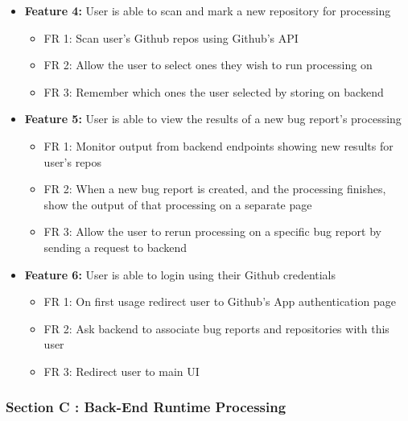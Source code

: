 \documentclass[12pt]{article}
\providecommand{\tightlist}{%
  \setlength{\itemsep}{0pt}\setlength{\parskip}{0pt}}
\begin{document}
\begin{itemize}
\tightlist
\item
  \textbf{Feature 4:} User is able to scan and mark a new repository for
  processing

  \begin{itemize}
  \tightlist
  \item
    FR 1: Scan user's Github repos using Github's API
  \item
    FR 2: Allow the user to select ones they wish to run processing on
  \item
    FR 3: Remember which ones the user selected by storing on backend
  \end{itemize}
\item
  \textbf{Feature 5:} User is able to view the results of a new bug
  report's processing

  \begin{itemize}
  \tightlist
  \item
    FR 1: Monitor output from backend endpoints showing new results for
    user's repos
  \item
    FR 2: When a new bug report is created, and the processing finishes,
    show the output of that processing on a separate page
  \item
    FR 3: Allow the user to rerun processing on a specific bug report by
    sending a request to backend
  \end{itemize}
\item
  \textbf{Feature 6:} User is able to login using their Github
  credentials

  \begin{itemize}
  \tightlist
  \item
    FR 1: On first usage redirect user to Github's App authentication
    page
  \item
    FR 2: Ask backend to associate bug reports and repositories with
    this user
  \item
    FR 3: Redirect user to main UI
  \end{itemize}
\end{itemize}

\hypertarget{section-c-back-end-runtime-processing}{%
\subsubsection{Section C : Back-End Runtime
Processing}\label{section-c-back-end-runtime-processing}}
\end{document}
